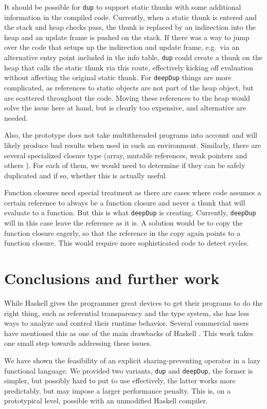 \documentclass[preprint]{sigplanconf}
\theoremstyle{nonumberplain}
\newcommand{\li}{\lstinline[style=Haskell]}
\begin{document}
It should be possible for \li-dup- to support static thunks with some additional information in the compiled code.  Currently, when a static thunk is entered and the stack and heap checks pass, the thunk is replaced by an indirection into the heap and an update frame is pushed on the stack. If there was a way to jump over the code that setups up the indirection and update frame, e.g.\ via an alternative entry point included in the info table, \li-dup- could create a thunk on the heap that calls the static thunk via this route, effectively kicking off evaluation without affecting the original static thunk.  For \li-deepDup- things are more complicated, as references to static objects are not part of the heap object, but are scattered throughout the code. Moving these references to the heap would solve the issue here at hand, but is clearly too expensive, and alternative are needed.

Also, the prototype does not take multithreaded programs into account and will likely produce bad results when used in such an environment. Similarly, there are several specialized closure type (array, mutable references, weak pointers and others \citep[page HeapObjects]{commentary}). For each of them, we would need to determine if they can be safely duplicated and if so, whether this is actually useful.

Function closures need special treatment as there are cases where code assumes a certain reference to always be a function closure and never a thunk that will evaluate to a function. But this is what \li-deepDup- is creating. Currently, \li-deepDup- will in this case leave the reference as it is. A solution would be to copy the function closure eagerly, so that the reference in the copy again points to a function closure. This would require more sophisticated code to detect cycles. 

\section{Conclusions and further work}

While Haskell gives the programmer great devices to get their programs to do the right thing, such as referential transparency and the type system, she has less ways to analyze and control their runtime behavior. Several commercial users have mentioned this as one of the main drawbacks of Haskell \citep{sampson,wehr,hesselink}. This work takes one small step towards addressing these issues.

We have shown the feasibility of an explicit sharing-preventing operator in a lazy functional language. We provided two variants, \li-dup- and \li-deepDup-, the former is simpler, but possibly hard to put to use effectively, the latter works more predictably, but may impose a larger performance penalty. This is, on a prototypical level, possible with an unmodified Haskell compiler.
\end{document}
